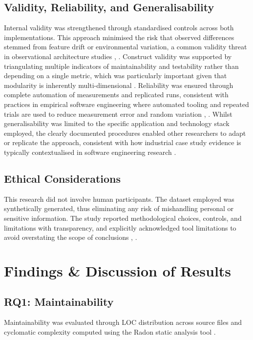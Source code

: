 \documentclass[conference]{IEEEtran}
\begin{document}
\subsection{Validity, Reliability, and Generalisability}
Internal validity was strengthened through standardised controls across both implementations. This approach minimised the risk that observed differences stemmed from feature drift or environmental variation, a common validity threat in observational architecture studies \cite{b3}, \cite{b6}. Construct validity was supported by triangulating multiple indicators of maintainability and testability rather than depending on a single metric, which was particularly important given that modularity is inherently multi-dimensional \cite{b4}. Reliability was ensured through complete automation of measurements and replicated runs, consistent with practices in empirical software engineering where automated tooling and repeated trials are used to reduce measurement error and random variation \cite{b4}, \cite{b7}. Whilst generalisability was limited to the specific application and technology stack employed, the clearly documented procedures enabled other researchers to adapt or replicate the approach, consistent with how industrial case study evidence is typically contextualised in software engineering research \cite{b7}.

\subsection{Ethical Considerations}
This research did not involve human participants. The dataset employed was synthetically generated, thus eliminating any risk of mishandling personal or sensitive information. The study reported methodological choices, controls, and limitations with transparency, and explicitly acknowledged tool limitations to avoid overstating the scope of conclusions \cite{b1}, \cite{b4}.

\section{Findings \& Discussion of Results}

\subsection*{RQ1: Maintainability}

Maintainability was evaluated through LOC distribution across source files and cyclomatic complexity computed using the Radon static analysis tool \cite{b4}.
\end{document}
